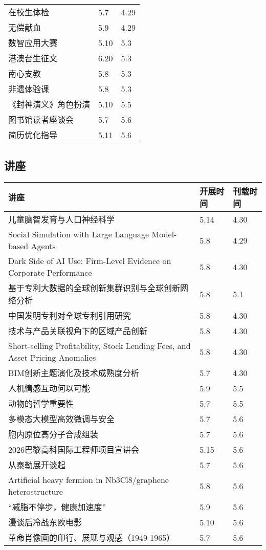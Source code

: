 \documentclass[letterpaper, 12pt]{article}
\begin{document}
\begin{multicols}{2}
{\begin{longtable}{|>{\centering\arraybackslash}m{}|m{}|m{}|}
    在校生体检 & 5.7 & 4.29\\
    无偿献血 & 5.9 & 4.29\\
    数智应用大赛 & 5.10 & 5.3\\
    港澳台生征文 & 6.20 & 5.3\\
    南心支教 & 5.8 & 5.3\\
    非遗体验课 & 5.8 & 5.3\\
    《封神演义》角色扮演 & 5.10 & 5.5\\
    图书馆读者座谈会 & 5.7 & 5.6\\
    简历优化指导 & 5.11 & 5.6\\
    \hline
\end{longtable}
\unskip
\unpenalty
\unpenalty}\unvbox\colbbox
\end{multicols}
\begin{multicols}{2}
\pagebreak

\section{讲座}
\begin{tabular}{|>{\centering\arraybackslash}m{}|m{}|m{}|}
    \hline
    讲座 & 开展时间 & 刊载时间\\
    \hline\hline
    儿童脑智发育与人口神经科学 & 5.14 & 4.30\\\hline
    Social Simulation with Large Language Model-based Agents & 5.8 & 4.29\\\hline
    Dark Side of AI Use: Firm-Level Evidence on Corporate Performance & 5.8 & 4.30\\\hline
    基于专利大数据的全球创新集群识别与全球创新网络分析 & 5.8 & 5.1\\\hline
    中国发明专利对全球专利引用研究 & 5.8 & 4.30\\\hline
    技术与产品关联视角下的区域产品创新 & 5.8 & 4.30\\\hline
    Short-selling Profitability, Stock Lending Fees, and Asset Pricing Anomalies & 5.8 & 4.30\\\hline
    BIM创新主题演化及技术成熟度分析 & 5.7 & 4.30\\\hline
    人机情感互动何以可能 & 5.9 & 5.5\\\hline
    动物的哲学重要性 & 5.7 & 5.5\\\hline
    多模态大模型高效微调与安全 & 5.7 & 5.6\\\hline
    胞内原位高分子合成组装 & 5.7 & 5.6\\\hline
    2026巴黎高科国际工程师项目宣讲会 & 5.15 & 5.6\\\hline
    从泰勒展开谈起 & 5.7 & 5.6\\\hline
    Artificial heavy fermion in Nb3Cl8/graphene heterostructure & 5.8 & 5.6\\\hline
    “减脂不停步，健康加速度” & 5.9 & 5.6\\\hline
    漫谈后冷战东欧电影 & 5.10 & 5.6\\\hline
    革命肖像画的印行、展现与观感（1949-1965） & 5.7 & 5.6\\\hline
\end{tabular}

\end{multicols}
\end{document}
